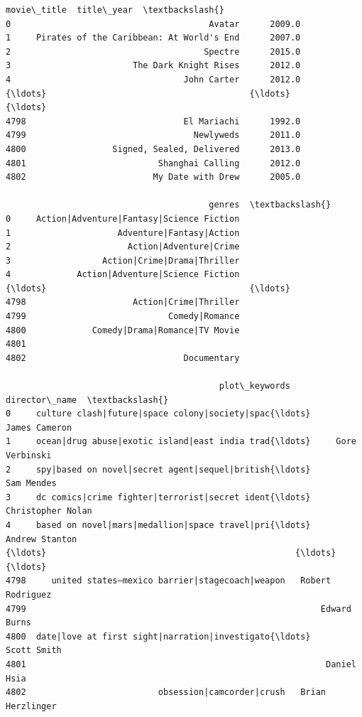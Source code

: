             \begin{tcolorbox}[breakable, boxrule=.5pt, size=fbox, pad at break*=1mm, opacityfill=0]
\begin{Verbatim}[commandchars=\\\{\}]
                                   movie\_title  title\_year  \textbackslash{}
0                                       Avatar      2009.0
1     Pirates of the Caribbean: At World's End      2007.0
2                                      Spectre      2015.0
3                        The Dark Knight Rises      2012.0
4                                  John Carter      2012.0
{\ldots}                                        {\ldots}         {\ldots}
4798                               El Mariachi      1992.0
4799                                 Newlyweds      2011.0
4800                 Signed, Sealed, Delivered      2013.0
4801                          Shanghai Calling      2012.0
4802                         My Date with Drew      2005.0

                                        genres  \textbackslash{}
0     Action|Adventure|Fantasy|Science Fiction
1                     Adventure|Fantasy|Action
2                       Action|Adventure|Crime
3                  Action|Crime|Drama|Thriller
4             Action|Adventure|Science Fiction
{\ldots}                                        {\ldots}
4798                     Action|Crime|Thriller
4799                            Comedy|Romance
4800             Comedy|Drama|Romance|TV Movie
4801
4802                               Documentary

                                          plot\_keywords      director\_name  \textbackslash{}
0     culture clash|future|space colony|society|spac{\ldots}      James Cameron
1     ocean|drug abuse|exotic island|east india trad{\ldots}     Gore Verbinski
2     spy|based on novel|secret agent|sequel|british{\ldots}         Sam Mendes
3     dc comics|crime fighter|terrorist|secret ident{\ldots}  Christopher Nolan
4     based on novel|mars|medallion|space travel|pri{\ldots}     Andrew Stanton
{\ldots}                                                 {\ldots}                {\ldots}
4798     united states–mexico barrier|stagecoach|weapon   Robert Rodriguez
4799                                                          Edward Burns
4800  date|love at first sight|narration|investigato{\ldots}        Scott Smith
4801                                                           Daniel Hsia
4802                          obsession|camcorder|crush   Brian Herzlinger


\end{Verbatim}
\end{tcolorbox}
